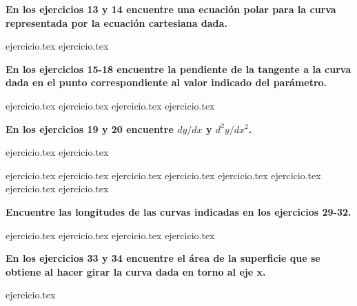 \vspace{0.3cm}
\noindent\textbf{En los ejercicios 13 y 14 encuentre una ecuación polar para la curva representada por la ecuación cartesiana dada.}
\begin{enumerate}
    \setcounter{enumi}{12}
    {ejercicio.tex}
{ejercicio.tex}
\end{enumerate}

\vspace{0.3cm}
\noindent\textbf{En los ejercicios 15-18 encuentre la pendiente de la tangente a la curva dada en el punto correspondiente al valor indicado del parámetro.}
\begin{enumerate}
    \setcounter{enumi}{14}
    {ejercicio.tex}
{ejercicio.tex}
{ejercicio.tex}
{ejercicio.tex}
\end{enumerate}

\vspace{0.3cm}
\noindent\textbf{En los ejercicios 19 y 20 encuentre $dy/dx$ y $d^2y/dx^2$.}
\begin{enumerate}
    \setcounter{enumi}{18}
    {ejercicio.tex}
{ejercicio.tex}
\end{enumerate}

\vspace{0.3cm}
\begin{enumerate}
    \setcounter{enumi}{20}
    {ejercicio.tex}
{ejercicio.tex}
{ejercicio.tex}
{ejercicio.tex}
{ejercicio.tex}
{ejercicio.tex}
{ejercicio.tex}
{ejercicio.tex}
\end{enumerate}

\vspace{0.3cm}
\noindent\textbf{Encuentre las longitudes de las curvas indicadas en los ejercicios 29-32.}
\begin{enumerate}
    \setcounter{enumi}{28}
    {ejercicio.tex}
{ejercicio.tex}
{ejercicio.tex}
{ejercicio.tex}
\end{enumerate}

\vspace{0.3cm}
\noindent\textbf{En los ejercicios 33 y 34 encuentre el área de la superficie que se obtiene al hacer girar la curva dada en torno al eje x.}
\begin{enumerate}
    \setcounter{enumi}{32}
    {ejercicio.tex}
\end{enumerate}

